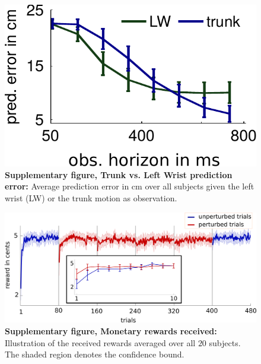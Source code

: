 \begin{figure}
\centering
\includegraphics[width=.4\textwidth]{Elmar/picsSupp/SubFigPredErrorTrunkvsLW}
 \caption{\textbf{Supplementary figure, Trunk vs. Left Wrist prediction error:} 
 Average prediction error in cm over all subjects given the left wrist (LW) or the trunk motion as observation. 
 }
\label{fig:SubFigPredErrorTrunkvsLW}
\end{figure}



\begin{figure}
\centering
\includegraphics[width=\textwidth]{Elmar/picsSupp/FigRewards}
 \caption{\textbf{Supplementary figure, Monetary rewards received: } 
 Illustration of the received rewards averaged over all $20$ subjects. The shaded region denotes the confidence bound. 
 }
\label{fig:SubFigRewards}
\end{figure}

